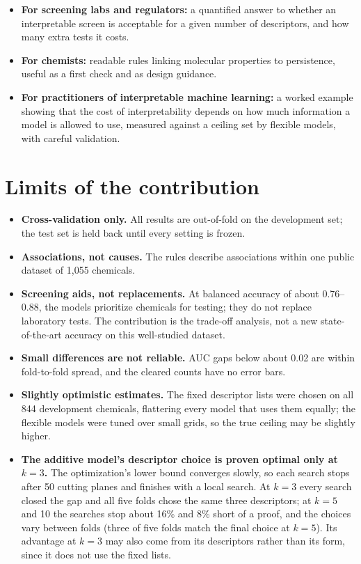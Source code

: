 \documentclass[11pt]{article}
\begin{document}
\begin{itemize}
  \item \textbf{For screening labs and regulators:} a quantified answer to whether an interpretable
        screen is acceptable for a given number of descriptors, and how many extra tests it costs.
  \item \textbf{For chemists:} readable rules linking molecular properties to persistence, useful
        as a first check and as design guidance.
  \item \textbf{For practitioners of interpretable machine learning:} a worked example showing that
        the cost of interpretability depends on how much information a model is allowed to use,
        measured against a ceiling set by flexible models, with careful validation.
\end{itemize}

\section*{Limits of the contribution}

\begin{itemize}
  \item \textbf{Cross-validation only.} All results are out-of-fold on the development set; the
        test set is held back until every setting is frozen.
  \item \textbf{Associations, not causes.} The rules describe associations within one public
        dataset of 1,055 chemicals.
  \item \textbf{Screening aids, not replacements.} At balanced accuracy of about 0.76--0.88, the
        models prioritize chemicals for testing; they do not replace laboratory tests. The
        contribution is the trade-off analysis, not a new state-of-the-art accuracy on this
        well-studied dataset.
  \item \textbf{Small differences are not reliable.} AUC gaps below about 0.02 are within
        fold-to-fold spread, and the cleared counts have no error bars.
  \item \textbf{Slightly optimistic estimates.} The fixed descriptor lists were chosen on all 844
        development chemicals, flattering every model that uses them equally; the flexible models
        were tuned over small grids, so the true ceiling may be slightly higher.
  \item \textbf{The additive model's descriptor choice is proven optimal only at $k=3$.} The
        optimization's lower bound converges slowly, so each search stops after 50 cutting planes and
        finishes with a local search. At $k=3$ every search closed the gap and all five folds chose
        the same three descriptors; at $k=5$ and 10 the searches stop about 16\% and 8\% short of a
        proof, and the choices vary between folds (three of five folds match the final choice at
        $k=5$). Its advantage at $k=3$ may also come from its descriptors rather than its form,
        since it does not use the fixed lists.
\end{itemize}
\end{document}
